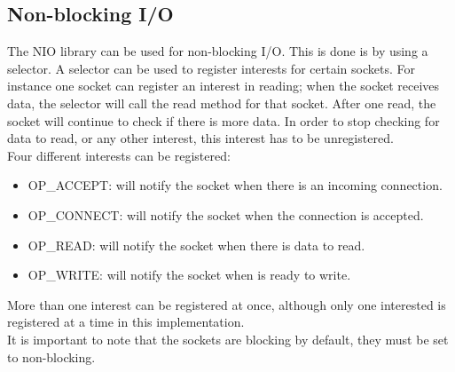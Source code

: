 \documentclass[11pt]{article}
\begin{document}
	\subsection{Non-blocking I/O}
	The NIO library can be used for non-blocking I/O. This is done is by using a selector. A selector can be used to register interests for certain sockets. For instance one socket can register an interest in reading; when the socket receives data, the selector will call the read method for that socket. After one read, the socket will continue to check if there is more data. In order to stop checking for data to read, or any other interest, this interest has to be unregistered.\\
	Four different interests can be registered:
	 \begin{itemize}
		\item OP\_ACCEPT: will notify the socket when there is an incoming connection.
		\item OP\_CONNECT: will notify the socket when the connection is accepted.
		\item OP\_READ: will notify the socket when there is data to read.
		\item OP\_WRITE: will notify the socket when is ready to write.
	\end{itemize}
	More than one interest can be registered at once, although only one interested is registered at a time in this implementation.\\
	It is important to note that the sockets are blocking by default, they must be set to non-blocking.
\end{document}
